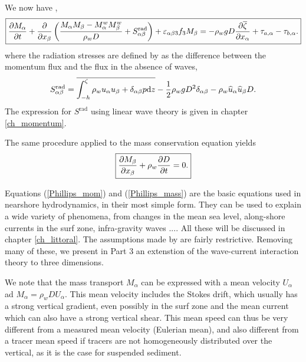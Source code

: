 We now have \citep{Smith2006b}, 
\begin{equation}
\fbox{$\displaystyle \frac{\partial M_\alpha }{\partial t} + \frac{\partial }{\partial x_\beta} \left( \frac{M_\alpha M_\beta-M_\alpha^w M_\beta^w}{\rho_w D} 
+ S^{\mathrm{rad}}_{\alpha \beta}\right) +\varepsilon_{\alpha \beta 3} f_3 M_\beta  = -\rho_w g D \frac{\partial \overline{\zeta}}{\partial x_\alpha} + \tau_{a,\alpha} - \tau_{b,\alpha}.$}\label{Phillips_mom}
\end{equation}
where the radiation stresses are defined by \cite{Phillips1977} as the difference between the momentum flux and the flux in the absence of waves, 
\begin{equation}
    S^{\mathrm{rad}}_{\alpha \beta}=\overline{\int_{-h}^\zeta \rho_w u_\alpha u_\beta +\delta_{\alpha \beta}  p \mathrm{d}z }
    -\frac{1}{2} \rho_w g D^2 \delta_{\alpha \beta}  - \rho_w \widehat{u}_\alpha \widehat{u}_\beta D. \label{Srad_def_Phillips}
\end{equation}
The expression for $S^{\mathrm{rad}}$ using linear wave theory is given in chapter \ref{ch_momentum}.

The same procedure applied to the mass conservation equation yields 
\begin{equation}
\fbox{$\displaystyle \frac{\partial M_\beta }{\partial x_\beta} + \rho_w \frac{\partial D}{\partial t}=0.$}\label{Phillips_mass}
\end{equation}

Equations (\ref{Phillips_mom}) and (\ref{Phillips_mass}) are the basic equations used in nearshore hydrodynamics, in their most 
simple form. They can be used to explain a wide variety of phenomena, from changes in the mean sea level, along-shore currents in the 
surf zone, infra-gravity waves ....  All these will be discussed in chapter \ref{ch_littoral}. The assumptions made by 
 \cite{Phillips1977} are fairly restrictive. Removing many of these, we present in Part 3 an extenstion of the wave-current interaction theory to three dimensions. 

We note that the mass transport $M_\alpha$ can be expressed with a mean velocity $U_\alpha$ ad $M_\alpha=\rho_w D U_\alpha$. 
This mean velocity includes the Stokes drift, which usually has a strong vertical gradient, even possibly in the surf zone  \citep{Ardhuin&al.2008}
and the mean current which can also have a strong vertical shear. 
This mean speed can thus be very different from a measured mean velocity (Eulerian mean), 
and also different from a tracer mean speed if tracers are not homogeneously 
distributed over the vertical, as it is the case for suspended sediment. 




